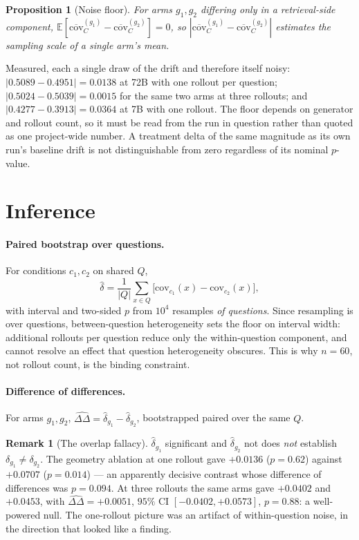 \documentclass[11pt]{article}
\newtheorem{proposition}{Proposition}
\theoremstyle{definition}
\newtheorem{remark}{Remark}
\newcommand{\cov}{\mathrm{cov}}
\newcommand{\E}{\mathbb{E}}
\newcommand{\1}{\mathbf{1}}
\begin{document}
\begin{proposition}[Noise floor]
For arms $g_1, g_2$ differing only in a retrieval-side component,
$\E[\overline{\cov}_C^{(g_1)} - \overline{\cov}_C^{(g_2)}] = 0$, so
$|\overline{\cov}_C^{(g_1)} - \overline{\cov}_C^{(g_2)}|$ estimates the
sampling scale of a single arm's mean.
\end{proposition}

\noindent
Measured, each a single draw of the drift and therefore itself noisy:
$|0.5089 - 0.4951| = 0.0138$ at 72B with one rollout per question;
$|0.5024 - 0.5039| = 0.0015$ for the same two arms at three rollouts; and
$|0.4277 - 0.3913| = 0.0364$ at 7B with one rollout. The floor depends on
generator and rollout count, so it must be read from the run in question rather
than quoted as one project-wide number. A treatment delta of the same magnitude
as its own run's baseline drift is not distinguishable from zero regardless of
its nominal $p$-value.

\section{Inference}

\paragraph{Paired bootstrap over questions.} For conditions $c_1, c_2$ on shared
$Q$,
\[
  \hat\delta = \frac{1}{|Q|}\sum_{x \in Q}\big[\cov_{c_1}(x) - \cov_{c_2}(x)\big],
\]
with interval and two-sided $p$ from $10^4$ resamples \emph{of questions}. Since
resampling is over questions, between-question heterogeneity sets the floor on
interval width: additional rollouts per question reduce only the within-question
component, and cannot resolve an effect that question heterogeneity obscures.
This is why $n = 60$, not rollout count, is the binding constraint.

\paragraph{Difference of differences.} For arms $g_1, g_2$,
$\widehat{\Delta\Delta} = \hat\delta_{g_1} - \hat\delta_{g_2}$, bootstrapped
paired over the same $Q$.

\begin{remark}[The overlap fallacy]
$\hat\delta_{g_1}$ significant and $\hat\delta_{g_2}$ not does \emph{not}
establish $\delta_{g_1} \ne \delta_{g_2}$. The geometry ablation at one rollout
gave $+0.0136$ ($p = 0.62$) against $+0.0707$ ($p = 0.014$) --- an apparently
decisive contrast whose difference of differences was $p = 0.094$. At three
rollouts the same arms gave $+0.0402$ and $+0.0453$, with
$\widehat{\Delta\Delta} = +0.0051$, $95\%$ CI $[-0.0402, +0.0573]$, $p = 0.88$:
a well-powered null. The one-rollout picture was an artifact of within-question
noise, in the direction that looked like a finding.
\end{remark}
\end{document}
